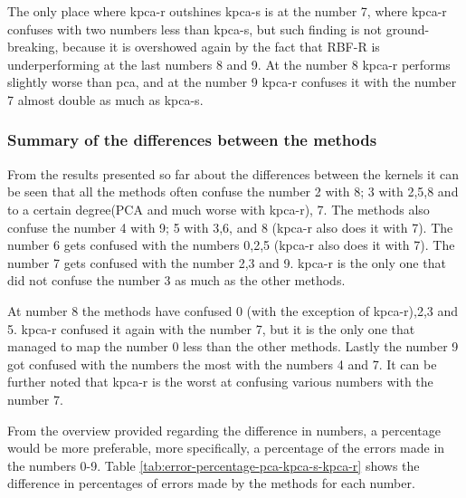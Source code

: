 The only place where \gls{kpca-r} outshines \gls{kpca-s} is at the number 7, where \gls{kpca-r} confuses with two numbers less than \gls{kpca-s}, but such finding is not ground-breaking, because it is overshowed again by the fact that RBF-R is underperforming at the last numbers 8 and 9. At the number 8 \gls{kpca-r} performs slightly worse than \gls{pca}, and at the number 9 \gls{kpca-r} confuses it with the number 7 almost double as much as \gls{kpca-s}.


\subsubsection{Summary of the differences between the methods}
From the results presented so far about the differences between the kernels it can be seen that all the methods often confuse the number 2 with 8; 3 with 2,5,8 and to a certain degree(PCA and much worse with \gls{kpca-r}), 7. The methods also confuse the number 4 with 9; 5 with 3,6, and 8 (\gls{kpca-r} also does it with 7). The number 6 gets confused with the numbers 0,2,5 (\gls{kpca-r} also does it with 7).
The number 7 gets confused with the number 2,3 and 9. \gls{kpca-r} is the only one that did not confuse the number 3 as much as the other methods.

At number 8 the methods have confused 0 (with the exception of \gls{kpca-r}),2,3 and 5. \gls{kpca-r} confused it again with the number 7, but it is the only one that managed to map the number 0 less than the other methods. Lastly the number 9 got confused with the numbers the most with the numbers 4 and 7. It can be further noted that \gls{kpca-r} is the worst at confusing various numbers with the number 7.


From the overview provided regarding the difference in numbers, a percentage would be more preferable, more specifically, a percentage of the errors made in the numbers 0-9. Table \ref{tab:error-percentage-pca-kpca-s-kpca-r} shows the difference in percentages of errors made by the methods for each number.

